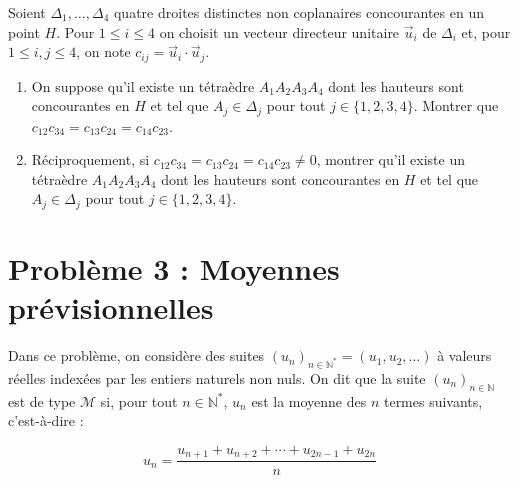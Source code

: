 \documentclass[landscape,twocolumn,leqno,a4paper,10pt]{report} %
\newcommand\n{\noindent}
\renewcommand{\leq}{\leqslant}
\begin{document}
\begin{enumerate}
	Soient $\Delta_{1}, \ldots, \Delta_{4}$ quatre droites distinctes non coplanaires concourantes en un point $H$. Pour $1 \leq i \leq 4$ on choisit un vecteur directeur unitaire $\vec{u}_{i}$ de $\Delta_{i}$ et, pour $1 \leq i, j \leq 4$, on note $c_{i j}=\vec{u}_{i} \cdot \vec{u}_{j}$.
	\begin{enumerate}
		\item On suppose qu'il existe un tétraèdre $A_{1} A_{2} A_{3} A_{4}$ dont les hauteurs sont concourantes en $H$ et tel que $A_{j} \in \Delta_{j}$ pour tout $j \in\{1,2,3,4\}$. Montrer que $c_{12} c_{34}=c_{13} c_{24}=c_{14} c_{23}$.
		\item Réciproquement, si $c_{12} c_{34}=c_{13} c_{24}=c_{14} c_{23} \neq 0$, montrer qu'il existe un tétraèdre $A_{1} A_{2} A_{3} A_{4}$ dont les hauteurs sont concourantes en $H$ et tel que $A_{j} \in \Delta_{j}$ pour tout $j \in\{1,2,3,4\}$.
	\end{enumerate}
\end{enumerate}

\newpage

\section{Problème 3 : Moyennes prévisionnelles}

\n Dans ce problème, on considère des suites $\left(u_{n}\right)_{n \in \mathbb{N}^{*}}=\left(u_{1}, u_{2}, \ldots\right)$ à valeurs réelles indexées par les entiers naturels non nuls. On dit que la suite $\left(u_{n}\right)_{n \in \mathbb{N}}$ est de type $\mathscr{M}$ si, pour tout $n \in \mathbb{N}^{*}$, $u_{n}$ est la moyenne des $n$ termes suivants, c'est-à-dire :

$$u_{n}=\frac{u_{n+1}+u_{n+2}+\cdots+u_{2 n-1}+u_{2 n}}{n}$$
\end{document}
